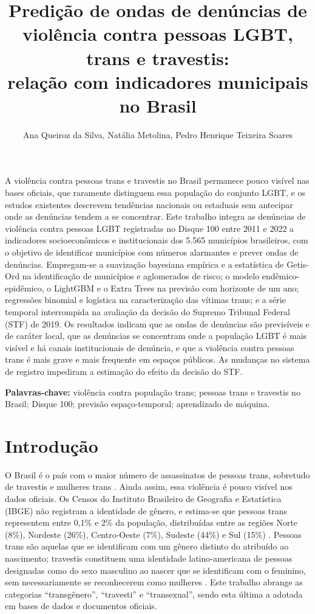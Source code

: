 \documentclass[12pt]{article}
\title{Predição de ondas de denúncias de violência contra pessoas LGBT, trans e travestis: \\ relação com indicadores municipais no Brasil}
\author{Ana Queiroz da Silva, Natália Metolina, Pedro Henrique Teixeira Soares}
\begin{document}
\maketitle
     
\begin{resumo}
A violência contra pessoas trans e travestis no Brasil permanece pouco visível nas bases oficiais, que raramente distinguem essa população do conjunto LGBT, e os estudos existentes descrevem tendências nacionais ou estaduais sem antecipar onde as denúncias tendem a se concentrar. Este trabalho integra as denúncias de violência contra pessoas LGBT registradas no Disque 100 entre 2011 e 2022 a indicadores socioeconômicos e institucionais dos 5.565 municípios brasileiros, com o objetivo de identificar municípios com números alarmantes e prever ondas de denúncias. Empregam-se a suavização bayesiana empírica e a estatística de Getis-Ord na identificação de municípios e aglomerados de risco; o modelo endêmico-epidêmico, o LightGBM e o Extra Trees na previsão com horizonte de um ano; regressões binomial e logística na caracterização das vítimas trans; e a série temporal interrompida na avaliação da decisão do Supremo Tribunal Federal (STF) de 2019. Os resultados indicam que as ondas de denúncias são previsíveis e de caráter local, que as denúncias se concentram onde a população LGBT é mais visível e há canais institucionais de denúncia, e que a violência contra pessoas trans é mais grave e mais frequente em espaços públicos. As mudanças no sistema de registro impediram a estimação do efeito da decisão do STF.

\textbf{Palavras-chave:} violência contra população trans; pessoas trans e travestis no Brasil; Disque 100; previsão espaço-temporal; aprendizado de máquina.
\end{resumo}


\clearpage
\section{Introdução}
\label{sec:introducao}

O Brasil é o país com o maior número de assassinatos de pessoas trans, sobretudo de travestis e mulheres trans \cite{marinho_tomazelli_firianelli:2024}. Ainda assim, essa violência é pouco visível nos dados oficiais. Os Censos do Instituto Brasileiro de Geografia e Estatística (IBGE) não registram a identidade de gênero, e estima-se que pessoas trans representem entre 0,1\% e 2\% da população, distribuídas entre as regiões Norte (8\%), Nordeste (26\%), Centro-Oeste (7\%), Sudeste (44\%) e Sul (15\%) \cite{spizziri_eufrasio_lima:2021}. Pessoas trans são aquelas que se identificam com um gênero distinto do atribuído ao nascimento; travestis constituem uma identidade latino-americana de pessoas designadas como do sexo masculino ao nascer que se identificam com o feminino, sem necessariamente se reconhecerem como mulheres \cite{leal_silva_lizzi:2026}. Este trabalho abrange as categorias ``transgênero'', ``travesti'' e ``transexual'', sendo esta última a adotada em bases de dados e documentos oficiais.
\end{document}
